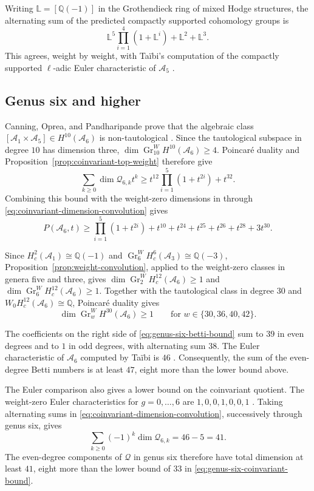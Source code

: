 \documentclass[12 pt]{amsart}
\newcommand{\LL}{\mathbb{L}}
\newcommand{\QQ}{\mathbb{Q}}
\newcommand{\cA}{\mathcal{A}}
\newcommand{\cQ}{\mathcal{Q}}
\newcommand{\Gr}{\operatorname{Gr}}
\newcommand{\<}{\langle}
\renewcommand{\>}{\rangle}
\theoremstyle{definition}
\begin{document}
Writing $\LL = [\QQ(-1)]$ in the Grothendieck ring of mixed Hodge structures, the alternating sum of the predicted compactly supported cohomology groups is
\[
\LL^5 \prod_{i = 1}^4(1 + \LL^i) + \LL^2 + \LL^3.
\]
This agrees, weight by weight, with Ta\"ibi's computation of the compactly supported $\ell$-adic Euler characteristic of $\cA_5$ \cite[Theorem~1]{TaibiEuler}.

\subsection{Genus six and higher}\label{sec:betti-higher-genus}

Canning, Oprea, and Pandharipande prove that the algebraic class $[\cA_1 \times \cA_5] \in H^{10}(\cA_6)$ is non-tautological \cite[\S1.6]{COP}. Since the tautological subspace in degree $10$ has dimension three, $\dim \Gr_{10}^W H^{10}(\cA_6) \geq 4$. Poincar\'e duality and Proposition~\ref{prop:coinvariant-top-weight} therefore give
\begin{equation}\label{eq:genus-six-coinvariant-bound}
\sum_{k \geq 0} \dim \cQ_{6, k} t^k \geq t^{12} \prod_{i = 1}^5(1 + t^{2i}) + t^{32}.
\end{equation}
Combining this bound with the weight-zero dimensions in \cite[Table~1]{BCGP} through \eqref{eq:coinvariant-dimension-convolution} gives
\begin{equation}\label{eq:genus-six-betti-bound}
P(\cA_6, t) \geq \prod_{i = 1}^5(1 + t^{2i}) + t^{10} + t^{24} + t^{25} + t^{26} + t^{28} + 3t^{30}.
\end{equation}

Since $H_c^2(\cA_1) \cong \QQ(-1)$ and $\Gr_6^W H_c^6(\cA_3) \cong \QQ(-3)$, Proposition~\ref{prop:weight-convolution}, applied to the weight-zero classes in genera five and three, gives $\dim \Gr_2^W H_c^{12}(\cA_6) \geq 1$ and $\dim \Gr_6^W H_c^{12}(\cA_6) \geq 1$. Together with the tautological class in degree $30$ and $W_0 H_c^{12}(\cA_6) \cong \QQ$, Poincar\'e duality gives
\[
\dim \Gr_w^W H^{30}(\cA_6) \geq 1 \qquad \text{for } w \in \{30, 36, 40, 42\}.
\]

The coefficients on the right side of \eqref{eq:genus-six-betti-bound} sum to $39$ in even degrees and to $1$ in odd degrees, with alternating sum $38$. The Euler characteristic of $\cA_6$ computed by Ta\"ibi is $46$ \cite[\S7.1]{HulekTommasiTopology}. Consequently, the sum of the even-degree Betti numbers is at least $47$, eight more than the lower bound above.

The Euler comparison also gives a lower bound on the coinvariant quotient. The weight-zero Euler characteristics for $g = 0, \ldots, 6$ are $1, 0, 0, 1, 0, 0, 1$ \cite[Table~1]{BCGP}. Taking alternating sums in \eqref{eq:coinvariant-dimension-convolution}, successively through genus six, gives
\[
\sum_{k \geq 0}(-1)^k \dim \cQ_{6, k} = 46 - 5 = 41.
\]
The even-degree components of $\cQ$ in genus six therefore have total dimension at least $41$, eight more than the lower bound of $33$ in \eqref{eq:genus-six-coinvariant-bound}.
\end{document}
